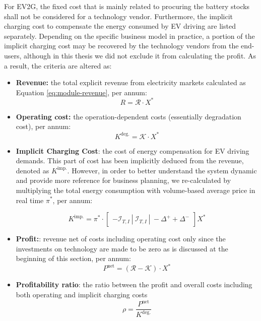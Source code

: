 For EV2G, the fixed cost that is mainly related to procuring the battery stocks shall not be considered for a technology vendor. Furthermore, the implicit charging cost to compensate the energy consumed by EV driving are listed separately. Depending on the specific business model in practice, a portion of the implicit charging cost may be recovered by the technology vendors from the end-users, although in this thesis we did not exclude it from calculating the profit. As a result, the criteria are altered as:
\begin{itemize}
	\item \textbf{Revenue:} the total explicit revenue from electricity markets calculated as Equation \eqref{eq:module-revenue}, per annum:
	\begin{equation*}
	R =  \mathcal{R} \cdot X^*
	\end{equation*}
	
	\item \textbf{Operating cost:} the operation-dependent costs (essentially degradation cost), per annum:
	\begin{equation*}
	K^{\text{deg.}} =  \mathcal{K} \cdot X^*
	\end{equation*}
	
	\item \textbf{Implicit Charging Cost}: the cost of energy compensation for EV driving demands. This part of cost has been implicitly deduced from the revenue, denoted as $K^{\text{imp.}}$. However, in order to better understand the system dynamic and provide more reference for business planning, we re-calculated by multiplying the total energy consumption with volume-based average price in real time $\pi^*$, per annum:
	
	\begin{equation*}
	K^{\text{imp.}} = \pi^* \cdot
	 \begin{bmatrix}
	 -\mathcal{I}_{T,I}~|~ \mathcal{I}_{T,I} ~|~ -\Delta^+ + \Delta^-
	\end{bmatrix} X^*
	\end{equation*}
	
	\item \textbf{Profit:}: revenue net of costs including operating cost only since the investments on technology are made to be zero as is discussed at the beginning of this section, per annum:
	\begin{equation*}
	P^{\text{net}} = \left( \mathcal{R} - \mathcal{K} \right) \cdot X^*
	\end{equation*}
	
	
	\item  \textbf{Profitability ratio}: the ratio between the profit and overall costs including both operating and implicit charging costs
	\begin{equation*}
	\rho = 	\frac{P^{\text{net}}}{K^{\text{deg.}}} %
	\end{equation*}
	
\end{itemize}

